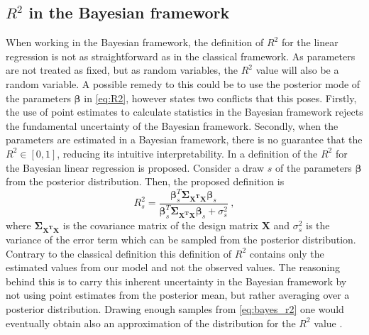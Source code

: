 \subsection{$R^2$ in the Bayesian framework}
\label{sec:bayes_R2}
When working in the Bayesian framework, the definition of $R^2$ for the linear regression is not as straightforward as in the classical framework. As parameters are not treated as fixed, but as random variables, the $R^2$ value will also be a random variable. A possible remedy to this could be to use the posterior mode of the parameters $\boldsymbol{\beta}$ in \eqref{eq:R2}, however \citet{gelman2017rsquared} states two conflicts that this poses. Firstly, the use of point estimates to calculate statistics in the Bayesian framework rejects the fundamental uncertainty of the Bayesian framework. Secondly, when the parameters are estimated in a Bayesian framework, there is no guarantee that the $R^2 \in [0, 1]$, reducing its intuitive interpretability. 
In \citet{gelman2017rsquared} a definition of the $R^2$ for the Bayesian linear regression is proposed. Consider a draw $s$ of the parameters $\boldsymbol{\beta}$ from the posterior distribution. Then, the proposed definition is
\begin{equation}
    \label{eq:bayes_r2}
    R_s^2 = \frac{\boldsymbol{\beta}_s^T \boldsymbol{\Sigma_{\mathbf{X^TX}}}\boldsymbol{\beta}_s}{\boldsymbol{\beta}_s^T \boldsymbol{\Sigma_{\mathbf{X^TX}}}\boldsymbol{\beta}_s + \sigma^2_s} \ ,
\end{equation}
where $\boldsymbol{\Sigma_{\mathbf{X^TX}}}$ is the covariance matrix of the design matrix $\mathbf{X}$ and $\sigma^2_s$ is the variance of the error term which can be sampled from the posterior distribution.
Contrary to the classical definition this definition of $R^2$ contains only the estimated values from our model and not the observed values. The reasoning behind this is to carry this inherent uncertainty in the Bayesian framework by not using point estimates from the posterior mean, but rather averaging over a posterior distribution. %
Drawing enough samples from \eqref{eq:bayes_r2} one would eventually obtain also an approximation of the distribution for the $R^2$ value \citep{gelman2017rsquared}.


